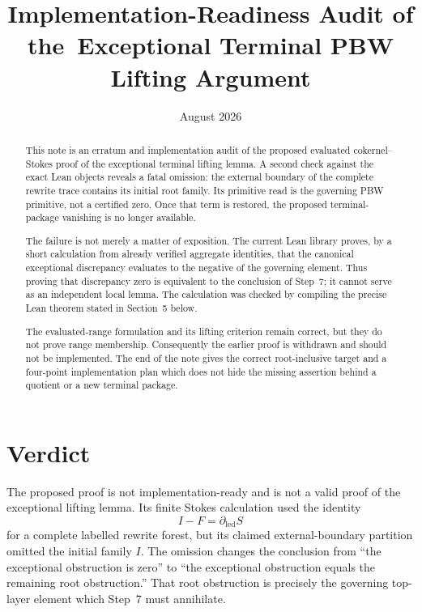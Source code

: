 \documentclass[11pt]{article}
\title{Implementation-Readiness Audit of the\
Exceptional Terminal PBW Lifting Argument}
\author{}
\date{August 2026}
\theoremstyle{definition}
\theoremstyle{remark}
\begin{document}
\maketitle

\begin{abstract}
This note is an erratum and implementation audit of the proposed evaluated
cokernel--Stokes proof of the exceptional terminal lifting lemma.  A second
check against the exact Lean objects reveals a fatal omission: the external
boundary of the complete rewrite trace contains its initial root family.
Its primitive read is the governing PBW primitive, not a certified zero.
Once that term is restored, the proposed terminal-package vanishing is no
longer available.

The failure is not merely a matter of exposition.  The current Lean library
proves, by a short calculation from already verified aggregate identities,
that the canonical exceptional discrepancy evaluates to the negative of the
governing element.  Thus proving that discrepancy zero is equivalent to the
conclusion of Step~7; it cannot serve as an independent local lemma.  The
calculation was checked by compiling the precise Lean theorem stated in
Section~5 below.

The evaluated-range formulation and its lifting criterion remain correct,
but they do not prove range membership.  Consequently the earlier proof is
withdrawn and should not be implemented.  The end of the note gives the
correct root-inclusive target and a four-point implementation plan which
does not hide the missing assertion behind a quotient or a new terminal
package.
\end{abstract}

\section{Verdict}

The proposed proof is not implementation-ready and is not a valid proof of
the exceptional lifting lemma.  Its finite Stokes calculation used the
identity
\[
                         I-F=\partial_{\mathrm{led}}S
\]
for a complete labelled rewrite forest, but its claimed external-boundary
partition omitted the initial family \(I\).  The omission changes the
conclusion from ``the exceptional obstruction is zero'' to ``the
exceptional obstruction equals the remaining root obstruction.''  That root
obstruction is precisely the governing top-layer element which Step~7 must
annihilate.
\end{document}
